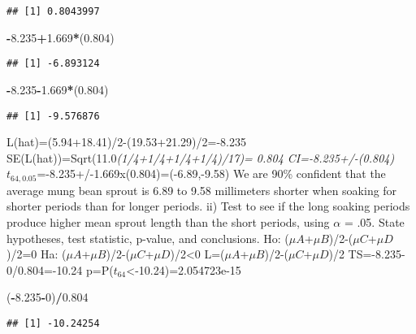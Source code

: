 \documentclass[]{article}
\newenvironment{Shaded}{\begin{snugshade}}{\end{snugshade}}
\newcommand{\DecValTok}[1]{\textcolor[rgb]{0.00,0.00,0.81}{#1}}
\newcommand{\FloatTok}[1]{\textcolor[rgb]{0.00,0.00,0.81}{#1}}
\newcommand{\OperatorTok}[1]{\textcolor[rgb]{0.81,0.36,0.00}{\textbf{#1}}}
\newcommand{\NormalTok}[1]{#1}
\begin{document}
\begin{verbatim}
## [1] 0.8043997
\end{verbatim}

\begin{Shaded}
\begin{Highlighting}[]
\OperatorTok{-}\FloatTok{8.235}\OperatorTok{+}\FloatTok{1.669}\OperatorTok{*}\NormalTok{(}\FloatTok{0.804}\NormalTok{)}
\end{Highlighting}
\end{Shaded}

\begin{verbatim}
## [1] -6.893124
\end{verbatim}

\begin{Shaded}
\begin{Highlighting}[]
\OperatorTok{-}\FloatTok{8.235}\OperatorTok{-}\FloatTok{1.669}\OperatorTok{*}\NormalTok{(}\FloatTok{0.804}\NormalTok{)}
\end{Highlighting}
\end{Shaded}

\begin{verbatim}
## [1] -9.576876
\end{verbatim}

L(hat)=(5.94+18.41)/2-(19.53+21.29)/2=-8.235
SE(L(hat))=Sqrt(11.0\emph{(1/4+1/4+1/4+1/4)/17)= 0.804
CI=-8.235+/-(0.804)}\(t_{64,0.05}\)=-8.235+/-1.669x(0.804)=(-6.89,-9.58)
We are 90\% confident that the average mung bean sprout is 6.89 to 9.58
millimeters shorter when soaking for shorter periods than for longer
periods. ii) Test to see if the long soaking periods produce higher mean
sprout length than the short periods, using \(\alpha\) = .05. State
hypotheses, test statistic, p-value, and conclusions. Ho:
(\(\mu{A}\)+\(\mu{B}\))/2-(\(\mu{C}\)+\(\mu{D}\))/2=0 Ha:
(\(\mu{A}\)+\(\mu{B}\))/2-(\(\mu{C}\)+\(\mu{D}\))/2\textless{}0
L=(\(\mu{A}\)+\(\mu{B}\))/2-(\(\mu{C}\)+\(\mu{D}\))/2
TS=-8.235-0/0.804=-10.24 p=P(\(t_{64}\)\textless{}-10.24)=2.054723e-15

\begin{Shaded}
\begin{Highlighting}[]
\NormalTok{(}\OperatorTok{-}\FloatTok{8.235}\OperatorTok{-}\DecValTok{0}\NormalTok{)}\OperatorTok{/}\FloatTok{0.804}
\end{Highlighting}
\end{Shaded}

\begin{verbatim}
## [1] -10.24254
\end{verbatim}
\end{document}

